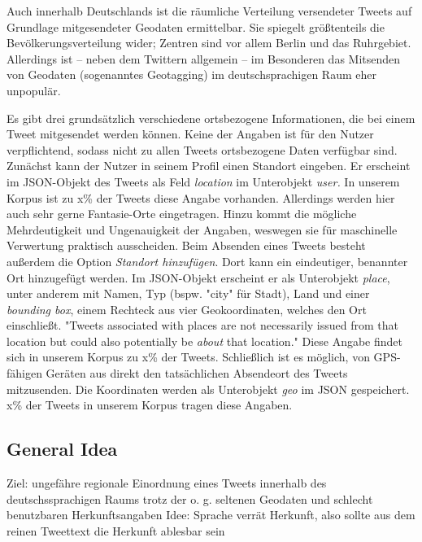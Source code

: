 \documentclass[../Main.tex]{subfiles}
\begin{document}
Auch innerhalb Deutschlands ist die räumliche Verteilung versendeter Tweets auf Grundlage mitgesendeter Geodaten ermittelbar. Sie spiegelt größtenteils die Bevölkerungsverteilung wider; Zentren sind vor allem Berlin und das Ruhrgebiet. Allerdings ist -- neben dem Twittern allgemein -- im Besonderen das Mitsenden von Geodaten (sogenanntes Geotagging) im deutschsprachigen Raum eher unpopulär.

Es gibt drei grundsätzlich verschiedene ortsbezogene Informationen, die bei einem Tweet mitgesendet werden können. Keine der Angaben ist für den Nutzer verpflichtend, sodass nicht zu allen Tweets ortsbezogene Daten verfügbar sind.
Zunächst kann der Nutzer in seinem Profil einen Standort eingeben. Er erscheint im JSON-Objekt des Tweets als Feld \textit{location} im Unterobjekt \textit{user.} In unserem Korpus ist zu x\% der Tweets diese Angabe vorhanden. Allerdings werden hier auch sehr gerne Fantasie-Orte eingetragen. Hinzu kommt die mögliche Mehrdeutigkeit und Ungenauigkeit der Angaben, weswegen sie für maschinelle Verwertung praktisch ausscheiden.
Beim Absenden eines Tweets besteht außerdem die Option \textit{Standort hinzufügen}. Dort kann ein eindeutiger, benannter Ort hinzugefügt werden. Im JSON-Objekt erscheint er als Unterobjekt \textit{place}, unter anderem mit Namen, Typ (bspw. "city" für Stadt), Land und einer \textit{bounding box}, einem Rechteck aus vier Geokoordinaten, welches den Ort einschließt.
"Tweets associated with places are not necessarily issued from that location but could also potentially be \textit{about} that location."
Diese Angabe findet sich in unserem Korpus zu x\% der Tweets.
Schließlich ist es möglich, von GPS-fähigen Geräten aus direkt den tatsächlichen Absendeort des Tweets mitzusenden. Die Koordinaten werden als Unterobjekt \textit{geo} im JSON gespeichert. x\% der Tweets in unserem Korpus tragen diese Angaben.


\subsection{General Idea}
Ziel: ungefähre regionale Einordnung eines Tweets innerhalb des deutschssprachigen Raums trotz der o. g. seltenen Geodaten und schlecht benutzbaren Herkunftsangaben %
Idee: Sprache verrät Herkunft, also sollte aus dem reinen Tweettext die Herkunft ablesbar sein %
\end{document}
